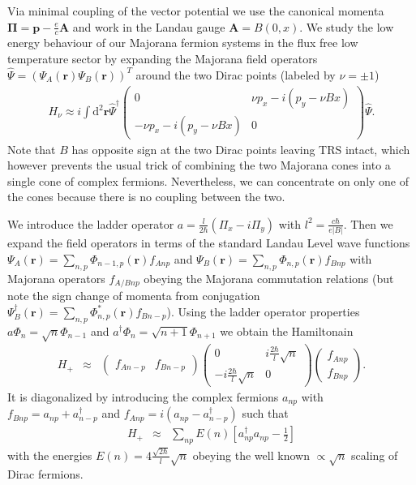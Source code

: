 \documentclass[reprint,amsmath,amssymb,aps,prl,groupedaddress,nofootinbib,superscriptaddress]{revtex4-1}
\newcommand{\1}{\mathds{1}}
\begin{document}
Via minimal coupling of the vector potential we use the canonical momenta $\mathbf{\Pi}= \mathbf{p}-\frac{e}{c} \mathbf{A}$ and work in the Landau gauge $\mathbf{A}=B(0,x)$. We study the low energy behaviour of our Majorana fermion systems in the flux free low temperature sector by expanding the Majorana field operators $\hat \Psi = \left( \Psi_{A}(\mathbf{r}) \Psi_{B}(\mathbf{r}) \right)^T$ around the two Dirac points (labeled by $\nu=\pm 1$)
\begin{eqnarray}
H_{\nu} \approx i \int \text{d}^2 \mathbf{r} 
\hat \Psi^{\dagger}
\begin{pmatrix}
0 & \nu p_x- i(p_y- \nu B x) \\
- \nu p_x- i(p_y-\nu B x) & 0 
\end{pmatrix}
\hat \Psi \nonumber .
\end{eqnarray}
Note that $B$ has opposite sign at the two Dirac points leaving TRS intact, which however prevents the usual trick of combining the two Majorana cones into a single cone of complex fermions. Nevertheless, we can concentrate on only one of the cones because there is no coupling between the two.  


We introduce the ladder operator $a=\frac{l}{2\hbar} \left(\Pi_x-i \Pi_y \right)$ with $l^2=\frac{c\hbar}{e|B|}$. Then we expand the field operators in terms of the standard Landau Level wave functions $\Psi_{A} (\mathbf{r}) = \sum_{n,p} \Phi_{n-1,p} (\mathbf{r}) f_{A n p}$ and $\Psi_{B} (\mathbf{r}) = \sum_{n,p} \Phi_{n,p} (\mathbf{r}) f_{B n p}$ with Majorana operators $f_{A/B n p}$ obeying the Majorana commutation relations (but note the sign change of momenta from conjugation $\Psi_{B}^{\dagger} (\mathbf{r}) = \sum_{n,p} \Phi^*_{n,p} (\mathbf{r}) f_{B n -p}$). Using the ladder operator properties $a \Phi_n=\sqrt{n} \Phi_{n-1}$ and $a^{\dagger} \Phi_n=\sqrt{n+1} \Phi_{n+1}$ we obtain the Hamiltonain
\begin{eqnarray}
H_{+}  & \approx & 
\begin{pmatrix}
f_{An-p} & f_{B n -p} 
\end{pmatrix}
\begin{pmatrix}
0 & i \frac{2 \hbar}{l} \sqrt{n} \\
- i \frac{2 \hbar}{l} \sqrt{n} & 0 
\end{pmatrix}
\begin{pmatrix}
f_{A n p} \\ f_{B n p} 
\end{pmatrix}.
\end{eqnarray}
It is diagonalized by introducing  the complex fermions $a_{np}$ with $f_{Bnp}=a_{np}+a^{\dagger}_{n-p}$ and $f_{Anp}=i \left(a_{np}  -a_{n-p}^{\dagger}\right)$ such that
\begin{eqnarray}
H_{+}  & \approx & 
\sum_{np} E(n) \left[ a_{np}^{\dagger} a_{np} -\frac{1}{2}\right] 
\end{eqnarray}
with the energies $E(n)=4 \frac{\sqrt{2\hbar}}{l} \sqrt{n}$ obeying the well known $\propto\sqrt{n}$ scaling of Dirac fermions. 
\end{document}
